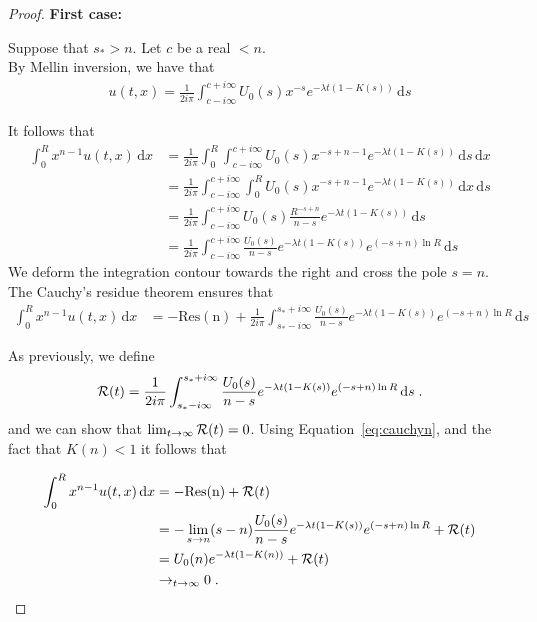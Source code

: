 \documentclass[11pt]{amsart}
\newcommand{\diff}{\,\mathrm{d}}
\begin{document}
\begin{proof}
\textbf{First case:}

Suppose that $s_* > n$. Let $c$ be a real $<n$. \\
    By Mellin inversion, we have that
    \begin{align*}
        u(t,x) = \frac{1}{2i\pi}\int_{c-i\infty}^{c+i\infty} U_0(s) x^{-s} e^{-\lambda t(1 - K(s))} \diff s
    \end{align*}

It follows that
\begin{align*}
    \int_0^R x^{n-1}u(t,x) \diff x 
    &= \frac{1}{2i\pi} \int_0^R \int_{c-i\infty}^{c+i\infty} U_0(s) x^{-s+n-1} e^{-\lambda t(1 - K(s))} \diff s \diff x \\
    &= \frac{1}{2i\pi} \int_{c-i\infty}^{c+i\infty} \int_0^R U_0(s) x^{-s+n-1} e^{-\lambda t(1 - K(s))} \diff x \diff s \\
    &= \frac{1}{2i\pi} \int_{c-i\infty}^{c+i\infty} U_0(s) \frac{R^{-s+n}}{n-s} e^{-\lambda t(1 - K(s))} \diff s \\
    &= \frac{1}{2i\pi} \int_{c-i\infty}^{c+i\infty} \frac{U_0(s)}{n-s} e^{-\lambda t(1 - K(s))} e^{(-s+n)\ln R} \diff s
\end{align*}
We deform the integration contour towards the right and cross the pole $s = n$. The Cauchy's residue theorem ensures that
\begin{align}
    \int_0^R x^{n-1}u(t,x) \diff x &= -\mathrm{Res(n)} + \frac{1}{2i\pi} \int_{s_*-i\infty}^{s_*+i\infty} \frac{U_0(s)}{n-s} e^{-\lambda t(1 - K(s))} e^{(-s+n)\ln R} \diff s 
    \label{eq:cauchyn}
\end{align}


As previously, we define
\begin{align*}
    \Rcal(t) = \frac{1}{2i\pi} \int_{s_*-i\infty}^{s_*+i\infty} \frac{U_0(s)}{n-s} e^{-\lambda t(1 - K(s))} e^{(-s+n)\ln R} \diff s
    \eqfinp
\end{align*}
and we can show that $\lim_{t\to\infty}\mathcal{R}(t) = 0$. Using Equation~\ref{eq:cauchyn}, and the fact that $K(n) < 1$ it follows that 


\begin{align*}
    \int_0^R x^{n-1}u(t,x) \diff x &= -\mathrm{Res(n)} + \Rcal(t) \\
    &= -\lim_{s \to n} (s-n)\frac{U_0(s)}{n-s} e^{-\lambda t(1 - K(s))} e^{(-s+n)\ln R}  + \Rcal(t)\\
    &= U_0(n)e^{-\lambda t(1 - K(n))} + \Rcal(t)\\
    &\to_{t \to \infty} 0
    \eqfinp
\end{align*}


\end{proof}
\end{document}
